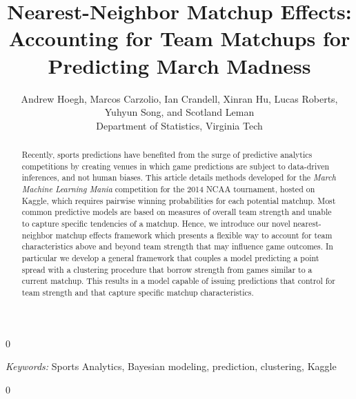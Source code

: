 \documentclass[letterpaper,12pt]{article}
\newcommand{\blind}{0}
\begin{document}
\blind
{
\title{Nearest-Neighbor Matchup Effects:  Accounting for Team Matchups for Predicting March Madness}
 \author{Andrew Hoegh, Marcos Carzolio, Ian Crandell, Xinran Hu, Lucas Roberts, \\Yuhyun Song, and Scotland Leman\\
 Department of Statistics, Virginia Tech}        
  \originalmaketitle
  \begin{abstract} 
\noindent
Recently, sports predictions have benefited from the surge of predictive analytics competitions by creating venues in which game predictions are subject to data-driven inferences, and not human biases. This article details methods developed for the \emph{March Machine Learning Mania} competition for the 2014 NCAA tournament, hosted on Kaggle, which requires pairwise winning probabilities for each potential matchup. Most common predictive models are based on measures of overall team strength and unable to capture specific tendencies of a matchup. Hence, we introduce our novel nearest-neighbor matchup effects framework which presents a flexible way to account for team characteristics above and beyond team strength that may influence game outcomes. In particular we develop a general framework that couples a model predicting a point spread with a clustering procedure that borrow strength from games similar to a current matchup. This results in a model capable of issuing predictions that control for team strength and that capture specific matchup characteristics.
\end{abstract}

\noindent%
{\it Keywords:}  Sports Analytics, Bayesian modeling, prediction, clustering, Kaggle

} \fi

\blind
{
} \fi

\newpage



\end{document}
